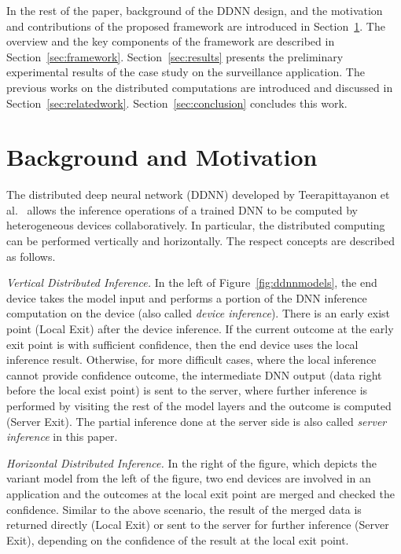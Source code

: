 \documentclass[conference]{IEEEtran}
\def\figurename{Figure}
\def\sectionname{Section}
\begin{document}
In the rest of the paper, background of the DDNN design, and the motivation and contributions of the proposed framework are introduced in \sectionname~\ref{sec:bk}. The overview and the key components of the framework are described in \sectionname~\ref{sec:framework}. \sectionname~\ref{sec:results} presents the preliminary experimental results of the case study on the surveillance application. The previous works on the distributed computations are introduced and discussed in \sectionname~\ref{sec:relatedwork}. \sectionname~\ref{sec:conclusion} concludes this work.

\section{Background and Motivation}
\label{sec:bk}
The distributed deep neural network (DDNN) developed by Teerapittayanon et al.~\cite{Teerapittayanon17} allows the inference operations of a trained DNN to be computed by heterogeneous devices collaboratively. In particular, the distributed computing can be performed vertically and horizontally. The respect concepts are described as follows.

\emph{Vertical Distributed Inference.} In the left of \figurename~\ref{fig:ddnnmodels}, the end device takes the model input and performs a portion of the DNN inference computation on the device (also called \emph{device inference}). There is an early exist point (Local Exit) after the device inference. If the current outcome at the early exit point is with sufficient confidence, then the end device uses the local inference result. Otherwise, for more difficult cases, where the local inference cannot provide confidence outcome, the intermediate DNN output (data right before the local exist point) is sent to the server, where further inference is performed by visiting the rest of the model layers and the outcome is computed (Server Exit). The partial inference done at the server side is also called \emph{server inference} in this paper.

\emph{Horizontal Distributed Inference.} In the right of the figure, which depicts the variant model from the left of the figure, two end devices are involved in an application and the outcomes at the local exit point are merged and checked the confidence. Similar to the above scenario, the result of the merged data is returned directly (Local Exit) or sent to the server for further inference (Server Exit), depending on the confidence of the result at the local exit point.
\end{document}
